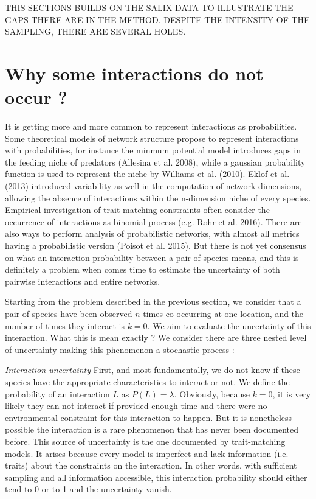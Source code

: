 \documentclass[12pt]{article}
\begin{document}
THIS SECTIONS BUILDS ON THE SALIX DATA TO ILLUSTRATE THE GAPS THERE ARE IN THE METHOD. DESPITE THE INTENSITY OF THE SAMPLING, THERE ARE SEVERAL HOLES.



\section*{Why some interactions do not occur ?}

It is getting more and more common to represent interactions as probabilities. Some theoretical models of network structure propose to represent interactions with probabilities, for instance the minmum potential model introduces gaps in the feeding niche of predators (Allesina et al. 2008), while a gaussian probability function is used to represent the niche by Williams et al. (2010). Eklof et al. (2013) introduced variability as well in the computation of network dimensions, allowing the absence of interactions within the n-dimension niche of every species. Empirical investigation of trait-matching constraints often consider the occurrence of interactions as binomial process (e.g. Rohr et al. 2016). There are also ways to perform analysis of probabilistic networks, with almost all metrics having a probabilistic version (Poisot et al. 2015). But there is not yet consensus on what an interaction probability between a pair of species means, and this is definitely a problem when comes time to estimate the uncertainty of both pairwise interactions and entire networks. 

Starting from the problem described in the previous section, we consider that a pair of species have been observed $n$ times co-occurring at one location, and the number of times they interact is $k = 0$. We aim to evaluate the uncertainty of this interaction. What this is mean exactly ? We consider there are three nested level of uncertainty making this phenomenon a stochastic process :  

\textit{Interaction uncertainty} First, and most fundamentally, we do not know if these species have the appropriate characteristics to interact or not. We define the probability of an interaction $L$ as $P(L)=\lambda$. Obviously, because $k=0$, it is very likely they can not interact if provided enough time and there were no environmental constraint for this interaction to happen. But it is nonetheless possible the interaction is a rare phenomenon that has never been documented before. This source of uncertainty is the one documented by trait-matching models. It arises because every model is imperfect and lack information (i.e. traits) about the constraints on the interaction. In other words, with sufficient sampling and all information accessible, this interaction probability should either tend to 0 or to 1 and the uncertainty vanish.  
\end{document}
